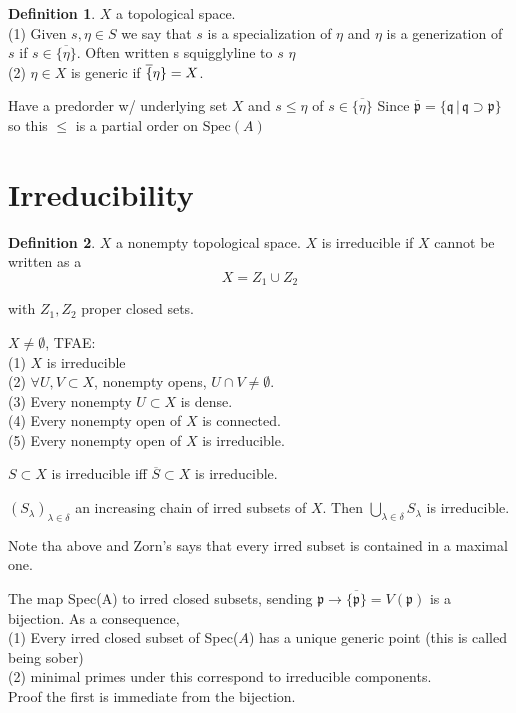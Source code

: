 \documentclass{article}
\theoremstyle{definition}
\theoremstyle{definition}
\newtheorem{definition}{Definition}[section]
\theoremstyle{remark}
\newcommand{\mk}[1]{\mathfrak{#1}}
\newcommand{\un}{\cup}
\newcommand{\ic}{\cap}
\begin{document}
\begin{definition}
	$X$ a topological space.\\
	(1) Given $s, \eta \in S$ we say that $s$ is a specialization of $\eta$ and $\eta$ is a generization of $s$ if $s \in \overline{\{\eta\}}$. 
	Often written s squigglyline to $s$ $\eta$\\
	(2) $\eta \in X$ is generic if $\overline\{\eta\} = X$.
\end{definition}

Have a predorder w/ underlying set $X$ and $s \leq \eta$ of $s \in \overline{\{\eta\}}$
Since $\overline{\mk{p}} = \{\mk{q} \,|\, \mk{q} \supset \mk{p}\}$ so this $\leq$ is a partial order on $\text{Spec}(A)$\\

\section{Irreducibility}

\begin{definition}
	$X$ a nonempty topological space. $X$ is irreducible if $X$ cannot be written as a 
	\[X = Z_1 \un Z_2 \]
\end{definition}
with $Z_1,Z_2$ proper closed sets.

\begin{lemm}{}{}
	$X \neq \emptyset$, TFAE:\\
	(1) $X$ is irreducible\\
	(2) $\forall U,V \subset X$, nonempty opens, $U \ic V \neq \emptyset$.\\
	(3) Every nonempty $U \subset X$ is dense.\\
	(4) Every nonempty open of $X$ is connected.\\
	(5) Every nonempty open of $X$ is irreducible.
\end{lemm}

\begin{lemm}{}{}
	$S \subset X$ is irreducible iff $\overline{S} \subset X$ is irreducible.
\end{lemm}

\begin{lemm}{}{}
	$(S_{\lambda})_{\lambda \in \delta}$ an increasing chain of irred subsets of $X$.
	Then $\bigcup_{\lambda \in \delta} S_{\lambda}$ is irreducible.
\end{lemm}

Note tha above and Zorn's says that every irred subset is contained in a maximal one.

\begin{lemm}{}{}
	The map Spec(A) to irred closed subsets, sending $\mk{p} \to \overline{\{\mk{p}\}} = V(\mk{p})$ is a bijection. 
	As a consequence,\\
	(1) Every irred closed subset of Spec($A$) has a unique generic point (this is called being sober)\\
	(2) minimal primes under this correspond to irreducible components.\\

	Proof the first is immediate from the bijection.
\end{lemm}
\end{document}

